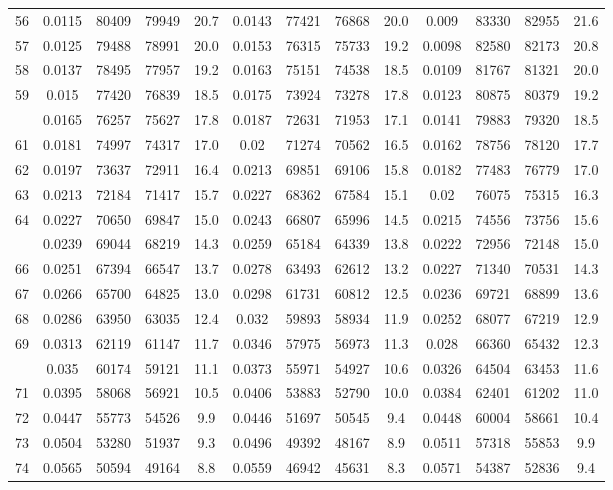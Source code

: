 \documentclass[
  14pt,
]{article}
\begin{document}
\begin{longtable}[t]{lcccccccccccc}
56 & 0.0115 & 80409 & 79949 & 20.7 & 0.0143 & 77421 & 76868 & 20.0 & 0.009 & 83330 & 82955 & 21.6\\
57 & 0.0125 & 79488 & 78991 & 20.0 & 0.0153 & 76315 & 75733 & 19.2 & 0.0098 & 82580 & 82173 & 20.8\\
58 & 0.0137 & 78495 & 77957 & 19.2 & 0.0163 & 75151 & 74538 & 18.5 & 0.0109 & 81767 & 81321 & 20.0\\
59 & 0.015 & 77420 & 76839 & 18.5 & 0.0175 & 73924 & 73278 & 17.8 & 0.0123 & 80875 & 80379 & 19.2\\
\addlinespace
60 & 0.0165 & 76257 & 75627 & 17.8 & 0.0187 & 72631 & 71953 & 17.1 & 0.0141 & 79883 & 79320 & 18.5\\
61 & 0.0181 & 74997 & 74317 & 17.0 & 0.02 & 71274 & 70562 & 16.5 & 0.0162 & 78756 & 78120 & 17.7\\
62 & 0.0197 & 73637 & 72911 & 16.4 & 0.0213 & 69851 & 69106 & 15.8 & 0.0182 & 77483 & 76779 & 17.0\\
63 & 0.0213 & 72184 & 71417 & 15.7 & 0.0227 & 68362 & 67584 & 15.1 & 0.02 & 76075 & 75315 & 16.3\\
64 & 0.0227 & 70650 & 69847 & 15.0 & 0.0243 & 66807 & 65996 & 14.5 & 0.0215 & 74556 & 73756 & 15.6\\
\addlinespace
65 & 0.0239 & 69044 & 68219 & 14.3 & 0.0259 & 65184 & 64339 & 13.8 & 0.0222 & 72956 & 72148 & 15.0\\
66 & 0.0251 & 67394 & 66547 & 13.7 & 0.0278 & 63493 & 62612 & 13.2 & 0.0227 & 71340 & 70531 & 14.3\\
67 & 0.0266 & 65700 & 64825 & 13.0 & 0.0298 & 61731 & 60812 & 12.5 & 0.0236 & 69721 & 68899 & 13.6\\
68 & 0.0286 & 63950 & 63035 & 12.4 & 0.032 & 59893 & 58934 & 11.9 & 0.0252 & 68077 & 67219 & 12.9\\
69 & 0.0313 & 62119 & 61147 & 11.7 & 0.0346 & 57975 & 56973 & 11.3 & 0.028 & 66360 & 65432 & 12.3\\
\addlinespace
70 & 0.035 & 60174 & 59121 & 11.1 & 0.0373 & 55971 & 54927 & 10.6 & 0.0326 & 64504 & 63453 & 11.6\\
71 & 0.0395 & 58068 & 56921 & 10.5 & 0.0406 & 53883 & 52790 & 10.0 & 0.0384 & 62401 & 61202 & 11.0\\
72 & 0.0447 & 55773 & 54526 & 9.9 & 0.0446 & 51697 & 50545 & 9.4 & 0.0448 & 60004 & 58661 & 10.4\\
73 & 0.0504 & 53280 & 51937 & 9.3 & 0.0496 & 49392 & 48167 & 8.9 & 0.0511 & 57318 & 55853 & 9.9\\
74 & 0.0565 & 50594 & 49164 & 8.8 & 0.0559 & 46942 & 45631 & 8.3 & 0.0571 & 54387 & 52836 & 9.4\\

\end{longtable}
\end{document}
